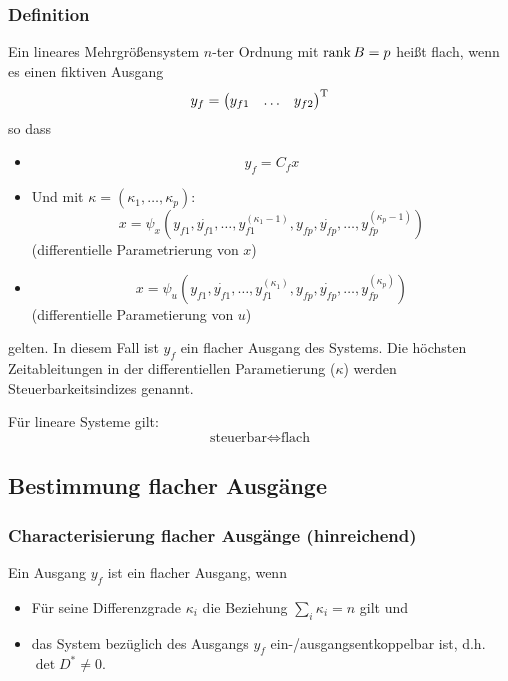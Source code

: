 \subsubsection{Definition}
Ein lineares Mehrgrößensystem $n$-ter Ordnung
\sy
mit $\operatorname*{rank} B = p$ heißt flach, wenn es einen fiktiven Ausgang
\begin{equation}
    y_f = {\begin{pmatrix} y_{f1} & \ldots & y_{f2} \end{pmatrix}}^\text{T}
\end{equation}
so dass
\begin{itemize}
    \item
        \begin{equation}
            y_f = C_f x
        \end{equation}
    \item Und mit $\kappa = (\kappa_1, \ldots, \kappa_p)$:
        \begin{equation}
            x = \psi_x(y_{f1}, \dot{y_{f1}}, \ldots, y_{f1}^{(\kappa_1-1)},
                 y_{fp}, \dot{y_{fp}}, \ldots, y_{fp}^{(\kappa_p-1)})
        \end{equation}
        (differentielle Parametrierung von $x$)
    \item
        \begin{equation}
            x = \psi_u(y_{f1}, \dot{y_{f1}}, \ldots, y_{f1}^{(\kappa_1)},
                 y_{fp}, \dot{y_{fp}}, \ldots, y_{fp}^{(\kappa_p)})
        \end{equation}
        (differentielle Parametierung von $u$) 
\end{itemize}
gelten. In diesem Fall ist $y_f$ ein flacher Ausgang des Systems.
Die höchsten Zeitableitungen in der differentiellen Parametierung ($\kappa$) werden
Steuerbarkeitsindizes genannt.

Für lineare Systeme gilt:
\begin{equation}
    \text{steuerbar} \Leftrightarrow \text{flach}
\end{equation}

\subsection{Bestimmung flacher Ausgänge}
\subsubsection{Characterisierung flacher Ausgänge (hinreichend)}
Ein Ausgang $y_f$ ist ein flacher Ausgang, wenn
\begin{itemize}
    \item Für seine Differenzgrade $\kappa_i$ die Beziehung $\sum_i \kappa_i = n$ gilt und
    \item das System bezüglich des Ausgangs $y_f$ ein-/ausgangsentkoppelbar ist, d.h.
        $\det D^* \neq 0$.
\end{itemize}


